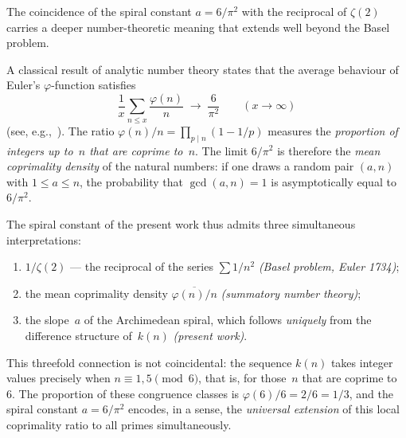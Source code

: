\begin{remark}
\label{rem:euler_coprimality}
The coincidence of the spiral constant $a = 6/\pi^2$ with the reciprocal
of $\zeta(2)$ carries a deeper number-theoretic meaning that extends well
beyond the Basel problem.

A classical result of analytic number theory states that the average
behaviour of Euler's $\varphi$-function satisfies
\begin{equation}\label{eq:euler_mean}
  \frac{1}{x}\sum_{n \leqslant x} \frac{\varphi(n)}{n}
  \;\longrightarrow\; \frac{6}{\pi^2}
  \qquad (x \to \infty)
\end{equation}
(see, e.g.,~\cite{Hardy2008}).
The ratio $\varphi(n)/n = \prod_{p \mid n}(1 - 1/p)$ measures the
\emph{proportion of integers up to~$n$ that are coprime to~$n$}.
The limit $6/\pi^2$ is therefore the \emph{mean coprimality density}
of the natural numbers: if one draws a random pair $(a,n)$ with
$1 \leqslant a \leqslant n$, the probability that $\gcd(a,n) = 1$
is asymptotically equal to $6/\pi^2$.

The spiral constant of the present work thus admits three simultaneous
interpretations:
\begin{enumerate}
\item $1/\zeta(2)$ — the reciprocal of the series $\sum 1/n^2$
      \emph{(Basel problem, Euler 1734)};
\item the mean coprimality density $\overline{\varphi(n)/n}$
      \emph{(summatory number theory)};
\item the slope~$a$ of the Archimedean spiral, which follows
      \emph{uniquely} from the difference structure of~$k(n)$
      \emph{(present work)}.
\end{enumerate}

This threefold connection is not coincidental: the sequence $k(n)$
takes integer values precisely when $n \equiv 1,5\pmod{6}$, that is,
for those~$n$ that are coprime to~$6$. The proportion of these
congruence classes is $\varphi(6)/6 = 2/6 = 1/3$, and the spiral
constant $a = 6/\pi^2$ encodes, in a sense, the \emph{universal
extension} of this local coprimality ratio to all primes simultaneously.
\end{remark}

